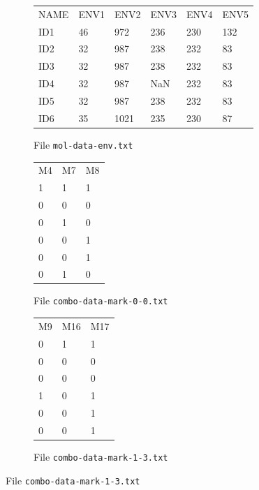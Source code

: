 \documentclass[a4paper,11pt]{article}
\begin{document}
\begin{figure}[htbp]
\begin{minipage}{1.2\textwidth}

\centering
\begin{subfigure}{\textwidth}
		\begin{mdframed}[backgroundcolor=white,userdefinedwidth=9.5cm,align=center]
		\begin{tabular}{*6{l}}
NAME & ENV1 & ENV2 & ENV3 & ENV4 & ENV5 \\ 
ID1 & 46 & 972 & 236 & 230 & 132 \\ 
ID2 & 32 & 987 & 238 & 232 & 83 \\ 
ID3 & 32 & 987 & 238 & 232 & 83 \\ 
ID4 & 32 & 987 & NaN & 232 & 83 \\ 
ID5 & 32 & 987 & 238 & 232 & 83 \\ 
ID6 & 35 & 1021 & 235 & 230 & 87 \\ 		\end{tabular}
	\end{mdframed}
	\parbox[l]{\textwidth}{\caption{File \texttt{mol-data-env.txt}\label{fig:combo-split-env}}}
	\end{subfigure}%
	
\vspace{2mm}	
	
	\begin{subfigure}[t]{.45\textwidth}
		\begin{mdframed}[backgroundcolor=white,userdefinedwidth=3.7cm,align=center]
		\begin{tabular}{lll}
M4 & M7 & M8 \\ 
1 & 1 & 1 \\ 
0 & 0 & 0 \\ 
0 & 1 & 0 \\ 
0 & 0 & 1 \\ 
0 & 0 & 1 \\ 
0 & 1 & 0 \\ 
		\end{tabular}
	\end{mdframed}
	\parbox[l]{\textwidth}{\caption{File \texttt{combo-data-mark-0-0.txt}\label{fig:combo-split-mol-0}}}
	\end{subfigure}%
	\begin{subfigure}[t]{.45\textwidth}
		\begin{mdframed}[backgroundcolor=white,userdefinedwidth=3.7cm,align=center]
		\begin{tabular}{lll}
M9 & M16 & M17 \\ 
0 & 1 & 1 \\ 
0 & 0 & 0 \\ 
0 & 0 & 0 \\ 
1 & 0 & 1 \\ 
0 & 0 & 1 \\ 
0 & 0 & 1 \\ 
		\end{tabular}
	\end{mdframed}
	\parbox[l]{\textwidth}{\caption{File \texttt{combo-data-mark-1-3.txt}\label{fig:combo-split-mol-1}}}
	\end{subfigure}	
	\hfill


\end{minipage}
\end{figure}
\end{document}

